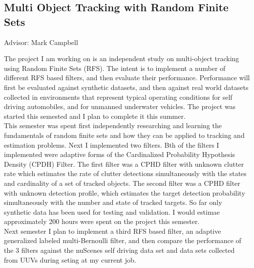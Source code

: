 \documentclass{article}
\begin{document}
\begin{center}
  \section*{Multi Object Tracking with Random Finite Sets}
  Advisor: Mark Campbell
\end{center}


The project I am working on is an independent study on multi-object tracking using Random Finite Sets (RFS). The intent is to implement a number of different RFS based filters, and then evaluate their performance. Performance will first be evaluated against synthetic datasets, and then against real world datasets collected in environments that represent typical operating conditions for self driving automobiles, and for unmanned underwater vehicles. The project was started this semested and I plan to complete it this summer.\\

This semester was spent first independently researching and learning the fundamentals of random finite sets and how they can be applied to tracking and estimation problems. Next I implemented two filters. Bth of the filters I implemented were adaptive forms of the Cardinalized Probability Hypothesis Density (CPDH) Filter. The first filter was a CPHD filter with unknown clutter rate \cite{cphd} which estimates the rate of clutter detections simultaneously with the states and cardinality of a set of tracked objects. The second filter was a CPHD filter with unknown detection profile\cite{cphd}, which estimates the target detection probability simultaneously with the number and state of tracked targets. So far only synthetic data has been used for testing and validation. I would estimae approximately 200 hours were spent on the project this semester.\\

Next semester I plan to implement a third RFS based filter, an adaptive generalized labeled multi-Bernoulli filter\cite{adaptive_dglmb}, and then compare the performance of the 3 filters against the nuScenes self driving data set\cite{nuscenes} and data sets collected from UUVs during seting at my current job.


\clearpage
\pagebreak
\printbibliography
\end{document}
